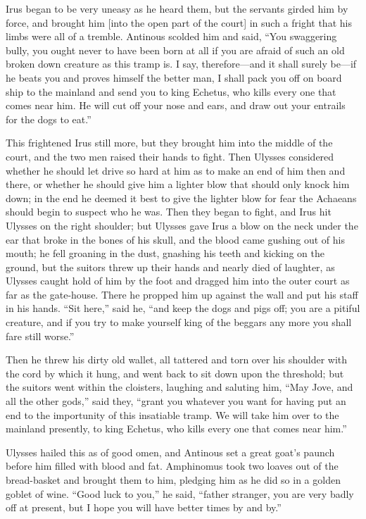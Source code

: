 Irus began to be very uneasy as he heard them, but the servants girded him by
force, and brought him [into the open part of the court] in such a fright that
his limbs were all of a tremble. Antinous scolded him and said, “You swaggering
bully, you ought never to have been born at all if you are afraid of such an
old broken down creature as this tramp is. I say, therefore—and it shall surely
be—if he beats you and proves himself the better man, I shall pack you off on
board ship to the mainland and send you to king Echetus, who kills every one
that comes near him. He will cut off your nose and ears, and draw out your
entrails for the dogs to eat.”

This frightened Irus still more, but they brought him into the middle of the
court, and the two men raised their hands to fight. Then Ulysses considered
whether he should let drive so hard at him as to make an end of him then and
there, or whether he should give him a lighter blow that should only knock him
down; in the end he deemed it best to give the lighter blow for fear the
Achaeans should begin to suspect who he was. Then they began to fight, and Irus
hit Ulysses on the right shoulder; but Ulysses gave Irus a blow on the neck
under the ear that broke in the bones of his skull, and the blood came gushing
out of his mouth; he fell groaning in the dust, gnashing his teeth and kicking
on the ground, but the suitors threw up their hands and nearly died of
laughter, as Ulysses caught hold of him by the foot and dragged him into the
outer court as far as the gate-house. There he propped him up against the wall
and put his staff in his hands. “Sit here,” said he, “and keep the dogs and
pigs off; you are a pitiful creature, and if you try to make yourself king of
the beggars any more you shall fare still worse.”

Then he threw his dirty old wallet, all tattered and torn over his shoulder
with the cord by which it hung, and went back to sit down upon the threshold;
but the suitors went within the cloisters, laughing and saluting him, “May
Jove, and all the other gods,” said they, “grant you whatever you want for
having put an end to the importunity of this insatiable tramp. We will take him
over to the mainland presently, to king Echetus, who kills every one that comes
near him.”

Ulysses hailed this as of good omen, and Antinous set a great goat’s paunch
before him filled with blood and fat. Amphinomus took two loaves out of the
bread-basket and brought them to him, pledging him as he did so in a golden
goblet of wine. “Good luck to you,” he said, “father stranger, you are very
badly off at present, but I hope you will have better times by and by.”

